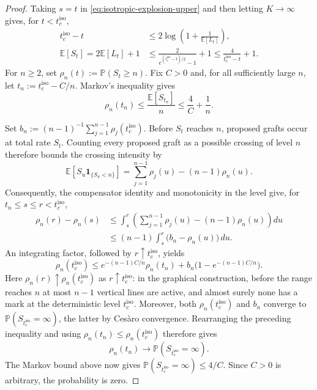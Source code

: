 \documentclass[11pt,a4paper]{amsart}
\theoremstyle{remark}
\begin{document}
\begin{proof}
Taking $s=t$ in \eqref{eq:isotropic-explosion-upper} and then letting
$K\to\infty$ gives, for $t<t_c^{\mathrm{iso}}$,
\[
\begin{aligned}
        t_c^{\mathrm{iso}}-t
        &\leq2\log\left(1+\frac1{\mathbb{E}[L_t]}\right),\\
        \mathbb{E}[S_t]
        =2\mathbb{E}[L_t]+1
        &\leq\frac{2}{e^{(t_c^{\mathrm{iso}}-t)/2}-1}+1
        \leq\frac{4}{t_c^{\mathrm{iso}}-t}+1.
\end{aligned}
\]
For $n\geq2$, set $\rho_n(t):=\mathbb{P}(S_t\geq n)$. Fix $C>0$ and, for
all sufficiently large $n$, let $t_n:=t_c^{\mathrm{iso}}-C/n$. Markov's
inequality gives
\[
        \rho_n(t_n)
        \leq\frac{\mathbb{E}[S_{t_n}]}n
        \leq\frac4C+\frac1n.
\]

Set
$b_n:=(n-1)^{-1}\sum_{j=1}^{n-1}\rho_j(t_c^{\mathrm{iso}})$. Before $S_t$
reaches $n$, proposed grafts occur at total rate $S_t$. Counting every
proposed graft as a possible crossing of level $n$ therefore bounds the
crossing intensity by
\[
        \mathbb E\left[S_u\mathbf 1_{\{S_u<n\}}\right]
        =\sum_{j=1}^{n-1}\rho_j(u)-(n-1)\rho_n(u).
\]
Consequently, the compensator identity and monotonicity in the level give,
for $t_n\leq s\leq r<t_c^{\mathrm{iso}}$,
\[
\begin{aligned}
        \rho_n(r)-\rho_n(s)
        &\leq
        \int_s^r\left(
        \sum_{j=1}^{n-1}\rho_j(u)-(n-1)\rho_n(u)\right)du \\
        &\leq
        (n-1)\int_s^r\bigl(b_n-\rho_n(u)\bigr)\,du.
\end{aligned}
\]
An integrating factor, followed by $r\uparrow t_c^{\mathrm{iso}}$, yields
\[
        \rho_n(t_c^{\mathrm{iso}})
        \leq
        e^{-(n-1)C/n}\rho_n(t_n)
        +b_n\bigl(1-e^{-(n-1)C/n}\bigr).
\]
Here $\rho_n(r)\uparrow\rho_n(t_c^{\mathrm{iso}})$ as
$r\uparrow t_c^{\mathrm{iso}}$: in the graphical construction, before the
range reaches $n$ at most $n-1$ vertical lines are active, and almost surely
none has a mark at the deterministic level $t_c^{\mathrm{iso}}$.
Moreover, both $\rho_n(t_c^{\mathrm{iso}})$ and $b_n$ converge to
$\mathbb{P}(S_{t_c^{\mathrm{iso}}}=\infty)$, the latter by Ces\`aro
convergence. Rearranging the preceding inequality and using
$\rho_n(t_n)\leq\rho_n(t_c^{\mathrm{iso}})$ therefore gives
\[
        \rho_n(t_n)\longrightarrow
        \mathbb{P}(S_{t_c^{\mathrm{iso}}}=\infty).
\]
The Markov bound above now gives
$\mathbb{P}(S_{t_c^{\mathrm{iso}}}=\infty)\leq4/C$. Since $C>0$ is
arbitrary, the probability is zero.
\end{proof}
\end{document}
